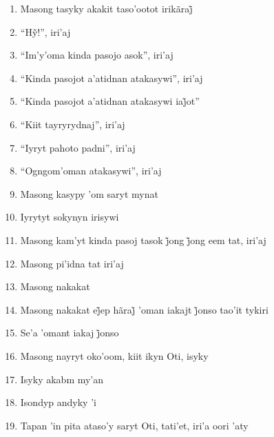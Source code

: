 \begin{enumerate}
 \item Masong tasyky akakit taso’ootot irikãraj̃

 \item ``Hỹ!'', iri’aj

 \item ``Im'y'oma kinda pasojo asok'', iri'aj

 \item ``Kinda pasojot a'atidnan atakasywi'', iri'aj

 \item ``Kinda pasojot a’atidnan atakasywi iaj̃ot''

 \item ``Kiit tayryrydnaj'', iri'aj

 \item ``Iyryt pahoto padni'', iri'aj

 \item ``Ogngom'oman atakasywi'', iri'aj

 \begin{center}\end{center}

 \item Masong kasypy 'om saryt mynat

 \item Iyrytyt sokynyn irisywi

 \item Masong kam’yt kinda pasoj tasok j̃ong j̃ong eem tat, iri’aj

 \item Masong pi'idna tat iri'aj

 \item Masong nakakat

 \item Masong nakakat ej̃ep hãraj̃ ’oman iakajt j̃onso tao’it tykiri

 \item Se’a ’omant iakaj j̃onso

 \begin{center}\end{center}

 \item Masong nayryt oko'oom, kiit ikyn Oti, isyky

 \item Isyky akabm my'an

 \item Isondyp andyky 'i

 \item Tapan 'in pita ataso'y saryt Oti, tati'et, iri'a oori 'aty


\end{enumerate}
